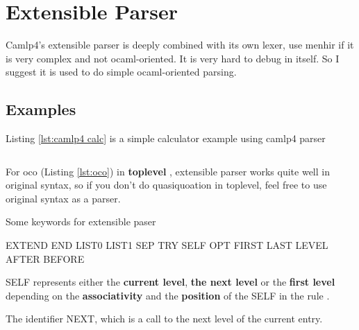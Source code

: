 \section{Extensible Parser}

Camlp4's extensible parser is deeply combined with its own lexer, use
menhir if it is very complex and not ocaml-oriented. It is very hard
to debug in itself. So I suggest it is used to do simple
ocaml-oriented parsing.

\subsection{Examples}
Listing \ref{lst:camlp4 calc} is a simple calculator example using
camlp4 parser


\inputminted[fontsize=\scriptsize]{ocaml}{code/camlp4/arith/simple_arith.ml}


For oco (Listing \ref{lst:oco}) in \textbf{ toplevel }, extensible
parser works quite well in original syntax, so if you don't do
quasiquoation in toplevel, feel free to use original syntax as a
parser.

Some keywords for extensible paser

\begin{ocamlcode}
  EXTEND END  LIST0 LIST1 SEP TRY SELF OPT  FIRST LAST  LEVEL AFTER BEFORE
\end{ocamlcode}


SELF represents either the \textbf{current level}, \textbf{the next
  level} or the \textbf{ first level} depending on the \textbf{
  associativity} and the \textbf{position} of the SELF in the rule .

The identifier NEXT, which is a call to the next level of the current
entry.

